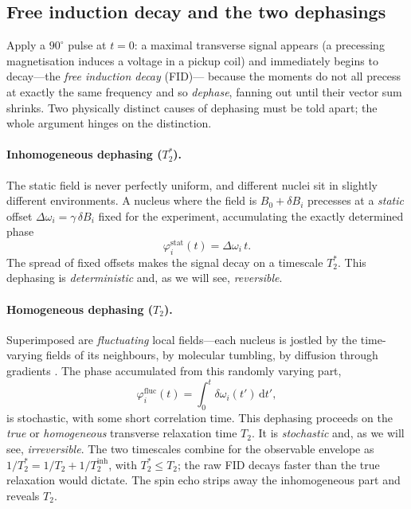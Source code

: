 \documentclass[11pt,a4paper]{article}
\theoremstyle{thmstyle}
\theoremstyle{definition}
\theoremstyle{remark}
\newcommand{\Tstar}{T_{2}^{*}}
\newcommand{\Ttwo}{T_{2}}
\begin{document}
\subsection{Free induction decay and the two dephasings}
\label{sec:fid}

Apply a $90^{\circ}$ pulse at $t=0$: a maximal transverse signal appears
(a precessing magnetisation induces a voltage in a pickup coil) and
immediately begins to decay---the \emph{free induction decay} (FID)---%
because the moments do not all precess at exactly the same frequency and
so \emph{dephase}, fanning out until their vector sum shrinks. Two
physically distinct causes of dephasing must be told apart; the whole
argument hinges on the distinction.

\paragraph{Inhomogeneous dephasing ($\Tstar$).} The static field is never
perfectly uniform, and different nuclei sit in slightly different
environments. A nucleus where the field is $B_{0}+\delta B_{i}$ precesses
at a \emph{static} offset $\Delta\omega_{i}=\gamma\,\delta B_{i}$ fixed
for the experiment, accumulating the exactly determined phase
\begin{equation}
\varphi_{i}^{\mathrm{stat}}(t)=\Delta\omega_{i}\,t.
\label{eq:phistat}
\end{equation}
The spread of fixed offsets makes the signal decay on a timescale
$\Tstar$. This dephasing is \emph{deterministic} and, as we will see,
\emph{reversible}.

\paragraph{Homogeneous dephasing ($\Ttwo$).} Superimposed are
\emph{fluctuating} local fields---each nucleus is jostled by the
time-varying fields of its neighbours, by molecular tumbling, by
diffusion through gradients \citep{bloch1946,bpp1948}. The phase
accumulated from this randomly varying part,
\begin{equation}
\varphi_{i}^{\mathrm{fluc}}(t)
=\int_{0}^{t}\delta\omega_{i}(t')\,\mathrm{d}t',
\label{eq:phifluc}
\end{equation}
is stochastic, with some short correlation time. This dephasing proceeds
on the \emph{true} or \emph{homogeneous} transverse relaxation time
$\Ttwo$. It is \emph{stochastic} and, as we will see,
\emph{irreversible}. The two timescales combine for the observable
envelope as $1/\Tstar=1/\Ttwo+1/\Ttwo^{\mathrm{inh}}$, with
$\Tstar\le\Ttwo$; the raw FID decays faster than the true relaxation
would dictate. The spin echo strips away the inhomogeneous part and
reveals $\Ttwo$.
\end{document}
